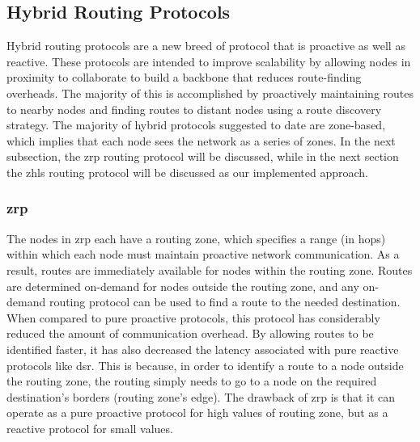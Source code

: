 \subsection{Hybrid Routing Protocols}
Hybrid routing protocols are a new breed of protocol that is proactive as well as reactive. These protocols are intended to improve scalability by allowing nodes in proximity to collaborate to build a backbone that reduces route-finding overheads. The majority of this is accomplished by proactively maintaining routes to nearby nodes and finding routes to distant nodes using a route discovery strategy. The majority of hybrid protocols suggested to date are zone-based\cite{hybrid}, which implies that each node sees the network as a series of zones. In the next subsection, the \acrshort{zrp} routing protocol will be discussed, while in the next section the \acrshort{zhls} routing protocol will be discussed as our implemented approach.

\subsubsection{\acrfull{zrp}}
The nodes in \acrshort{zrp} each have a routing zone, which specifies a range (in hops) within which each node must maintain proactive network communication. As a result, routes are immediately available for nodes within the routing zone. Routes are determined on-demand for nodes outside the routing zone, and any on-demand routing protocol can be used to find a route to the needed destination. When compared to pure proactive protocols, this protocol has considerably reduced the amount of communication overhead. By allowing routes to be identified faster, it has also decreased the latency associated with pure reactive protocols like \acrshort{dsr}. This is because, in order to identify a route to a node outside the routing zone, the routing simply needs to go to a node on the required destination's borders (routing zone's edge). The drawback of \acrshort{zrp} is that it can operate as a pure proactive protocol for high values of routing zone, but as a reactive protocol for small values. \cite{beijar2002zone}

